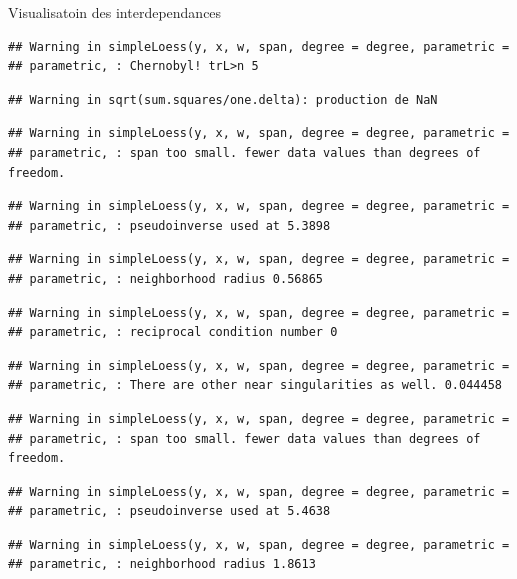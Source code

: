 \documentclass[11pt,ignorenonframetext,]{beamer}
\begin{document}
\begin{frame}[fragile]{Visualisatoin des interdependances}
\begin{verbatim}
## Warning in simpleLoess(y, x, w, span, degree = degree, parametric =
## parametric, : Chernobyl! trL>n 5
\end{verbatim}

\begin{verbatim}
## Warning in sqrt(sum.squares/one.delta): production de NaN
\end{verbatim}

\begin{verbatim}
## Warning in simpleLoess(y, x, w, span, degree = degree, parametric =
## parametric, : span too small. fewer data values than degrees of freedom.
\end{verbatim}

\begin{verbatim}
## Warning in simpleLoess(y, x, w, span, degree = degree, parametric =
## parametric, : pseudoinverse used at 5.3898
\end{verbatim}

\begin{verbatim}
## Warning in simpleLoess(y, x, w, span, degree = degree, parametric =
## parametric, : neighborhood radius 0.56865
\end{verbatim}

\begin{verbatim}
## Warning in simpleLoess(y, x, w, span, degree = degree, parametric =
## parametric, : reciprocal condition number 0
\end{verbatim}

\begin{verbatim}
## Warning in simpleLoess(y, x, w, span, degree = degree, parametric =
## parametric, : There are other near singularities as well. 0.044458
\end{verbatim}

\begin{verbatim}
## Warning in simpleLoess(y, x, w, span, degree = degree, parametric =
## parametric, : span too small. fewer data values than degrees of freedom.
\end{verbatim}

\begin{verbatim}
## Warning in simpleLoess(y, x, w, span, degree = degree, parametric =
## parametric, : pseudoinverse used at 5.4638
\end{verbatim}

\begin{verbatim}
## Warning in simpleLoess(y, x, w, span, degree = degree, parametric =
## parametric, : neighborhood radius 1.8613
\end{verbatim}


\end{frame}
\end{document}
